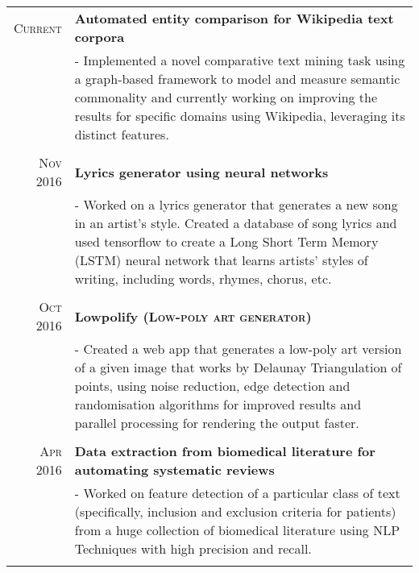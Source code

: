 \documentclass[a4paper,10pt]{extarticle} %
\begin{document}
\begin{tabular}{r|p{17.5cm}}

\textsc{Current} & \textbf{Automated entity comparison for Wikipedia text corpora} \\
& \footnotesize{- Implemented a novel comparative text mining task using a graph-based framework to model and measure semantic commonality and currently working on improving the results for specific domains using Wikipedia, leveraging its distinct features.}\\
\multicolumn{2}{c}{} \\

\textsc{Nov 2016} & \textbf{Lyrics generator using neural networks} \\
& \footnotesize{- Worked on a lyrics generator that generates a new song in an artist's style. Created a  database of song lyrics and used tensorflow to create a Long Short Term Memory (LSTM) neural network that learns artists' styles of writing, including words, rhymes, chorus, etc.}\\
\multicolumn{2}{c}{} \\

\textsc{Oct 2016} & \textbf{Lowpolify \textsc{(Low-poly art generator)}} \\
& \footnotesize{- Created a web app that generates a low-poly art version of a given image that works by Delaunay Triangulation of points, using noise reduction, edge detection and randomisation algorithms for improved results and parallel processing for rendering the output faster.}\\
\multicolumn{2}{c}{} \\

\textsc{Apr 2016} & \textbf{Data extraction from biomedical literature for automating systematic reviews} \\
& \footnotesize{- Worked on feature detection of a particular class of text (specifically, inclusion and exclusion criteria for patients) from a huge collection of biomedical literature using NLP Techniques with high precision and recall.}\\
\multicolumn{2}{c}{} \\


\end{tabular}
\end{document}
